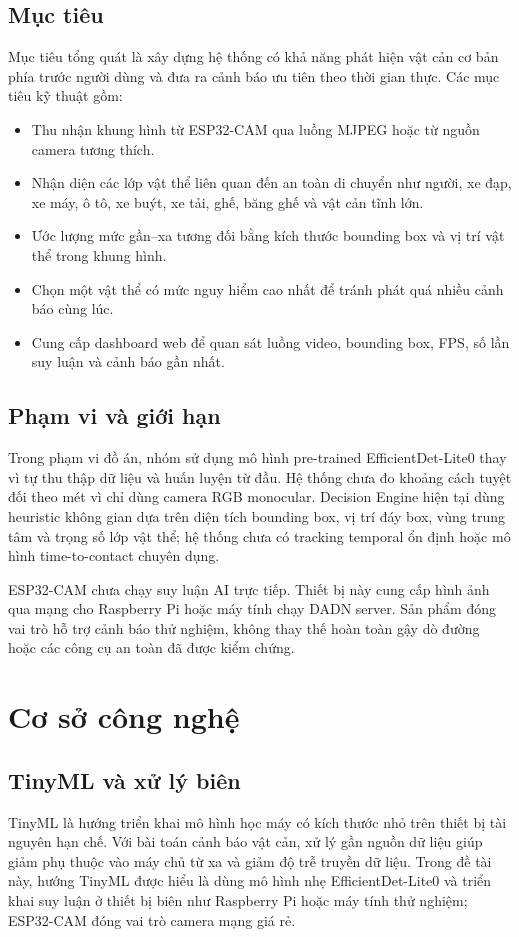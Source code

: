\documentclass[oneside,final]{hcmut-report}
\begin{document}
\subsection{Mục tiêu}
Mục tiêu tổng quát là xây dựng hệ thống có khả năng phát hiện vật cản cơ bản phía trước người dùng và đưa ra cảnh báo ưu tiên theo thời gian thực. Các mục tiêu kỹ thuật gồm:
\begin{itemize}
  \item Thu nhận khung hình từ ESP32-CAM qua luồng MJPEG hoặc từ nguồn camera tương thích.
  \item Nhận diện các lớp vật thể liên quan đến an toàn di chuyển như người, xe đạp, xe máy, ô tô, xe buýt, xe tải, ghế, băng ghế và vật cản tĩnh lớn.
  \item Ước lượng mức gần--xa tương đối bằng kích thước bounding box và vị trí vật thể trong khung hình.
  \item Chọn một vật thể có mức nguy hiểm cao nhất để tránh phát quá nhiều cảnh báo cùng lúc.
  \item Cung cấp dashboard web để quan sát luồng video, bounding box, FPS, số lần suy luận và cảnh báo gần nhất.
\end{itemize}

\subsection{Phạm vi và giới hạn}
Trong phạm vi đồ án, nhóm sử dụng mô hình pre-trained EfficientDet-Lite0 thay vì tự thu thập dữ liệu và huấn luyện từ đầu. Hệ thống chưa đo khoảng cách tuyệt đối theo mét vì chỉ dùng camera RGB monocular. Decision Engine hiện tại dùng heuristic không gian dựa trên diện tích bounding box, vị trí đáy box, vùng trung tâm và trọng số lớp vật thể; hệ thống chưa có tracking temporal ổn định hoặc mô hình time-to-contact chuyên dụng.

ESP32-CAM chưa chạy suy luận AI trực tiếp. Thiết bị này cung cấp hình ảnh qua mạng cho Raspberry Pi hoặc máy tính chạy DADN server. Sản phẩm đóng vai trò hỗ trợ cảnh báo thử nghiệm, không thay thế hoàn toàn gậy dò đường hoặc các công cụ an toàn đã được kiểm chứng.

\section{Cơ sở công nghệ}

\subsection{TinyML và xử lý biên}
TinyML là hướng triển khai mô hình học máy có kích thước nhỏ trên thiết bị tài nguyên hạn chế. Với bài toán cảnh báo vật cản, xử lý gần nguồn dữ liệu giúp giảm phụ thuộc vào máy chủ từ xa và giảm độ trễ truyền dữ liệu. Trong đề tài này, hướng TinyML được hiểu là dùng mô hình nhẹ EfficientDet-Lite0 và triển khai suy luận ở thiết bị biên như Raspberry Pi hoặc máy tính thử nghiệm; ESP32-CAM đóng vai trò camera mạng giá rẻ.
\end{document}
